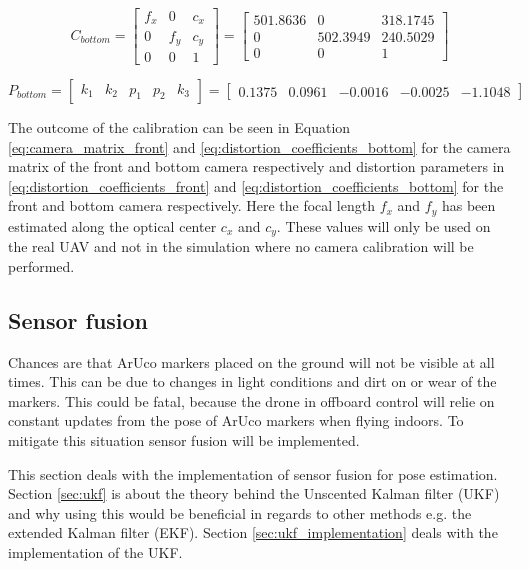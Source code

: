 \documentclass[../Head/report.tex]{subfiles}
\begin{document}
\begin{equation}
C_{bottom}  = 
\begin{bmatrix}
f_x & 0 & c_x\\
0 & f_y & c_y\\
0 & 0 & 1
\end{bmatrix}
=
\begin{bmatrix}
501.8636 & 0 & 318.1745\\
0 & 502.3949 & 240.5029\\
0 & 0 & 1
\end{bmatrix}
\label{eq:camera_matrix_bottom}
\end{equation}

\begin{equation}
P_{bottom} =
\begin{bmatrix}
k_1 & k_2 & p_1 & p_2 & k_3
\end{bmatrix}
=
\begin{bmatrix}
0.1375 & 0.0961 & -0.0016 & -0.0025 & -1.1048
\end{bmatrix}
\label{eq:distortion_coefficients_bottom}
\end{equation}

The outcome of the calibration can be seen in Equation \ref{eq:camera_matrix_front} and \ref{eq:distortion_coefficients_bottom} for the camera matrix of the front and bottom camera respectively and distortion parameters in \ref{eq:distortion_coefficients_front} and \ref{eq:distortion_coefficients_bottom} for the front and bottom camera respectively. Here the focal length $f_x$ and $f_y$ has been estimated along the optical center $c_x$ and $c_y$. These values will only be used on the real UAV and not in the simulation where no camera calibration will be performed. 


\subsection{Sensor fusion}
\label{sec:sensor_fusion}
Chances are that ArUco markers placed on the ground will not be visible at all times. This can be due to changes in light conditions and dirt on or wear of the markers. This could be fatal, because the drone in offboard control will relie on constant updates from the pose of ArUco markers when flying indoors. To mitigate this situation sensor fusion will be implemented. 

This section deals with the implementation of sensor fusion for pose estimation. Section \ref{sec:ukf} is about the theory behind the Unscented Kalman filter (UKF) and why using this would be beneficial in regards to other methods e.g. the extended Kalman filter (EKF). Section \ref{sec:ukf_implementation} deals with the implementation of the UKF.   
\end{document}
